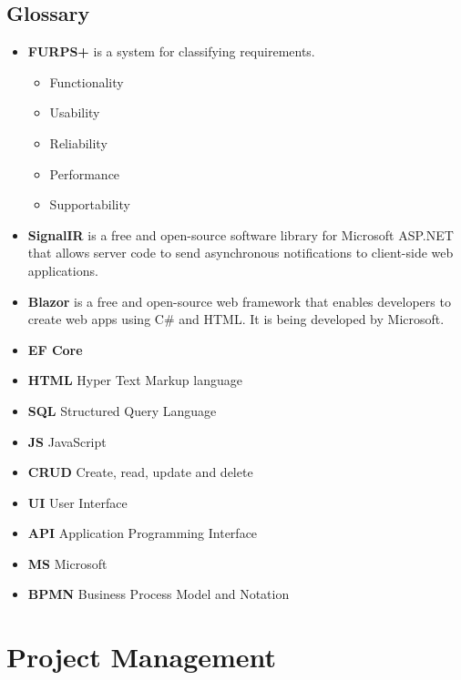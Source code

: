 \documentclass{scrartcl}
\begin{document}
\subsection{Glossary}
\begin{itemize}


\item \textbf{FURPS+}\cite{eeles2005capturing} is a system for classifying requirements.
\begin{itemize}
\item Functionality
\item Usability
\item Reliability
\item Performance
\item Supportability 
\end{itemize}


\item \textbf{ SignalIR} is a free and open-source software library for Microsoft ASP.NET that allows server code to send asynchronous notifications to client-side web applications. 

\item \textbf{Blazor} is a free and open-source web framework that enables developers to create web apps using C\# and HTML. It is being developed by Microsoft.

\item \textbf{EF Core} 

\item \textbf{HTML} Hyper Text Markup language


\item \textbf{SQL} Structured Query Language
\item \textbf{JS } JavaScript
\item \textbf{CRUD} Create, read, update and delete
\item \textbf{UI} User Interface
\item \textbf{API} Application Programming Interface 

\item \textbf{MS} Microsoft
\item \textbf{BPMN} Business Process Model and Notation



\end{itemize}

\section{Project Management}
\end{document}

